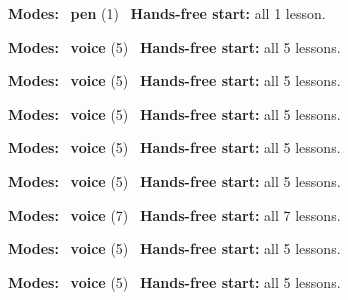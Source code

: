\expandafter\def\csname hlchaptermodality339\endcsname{%
  {\small\noindent
    \textbf{Modes:} \hlpensign{}~\textbf{pen} (1)\quad
    \hlvoicesign{}~\textbf{Hands-free start:} all 1 lesson.%
    \par}\medskip
}

\expandafter\def\csname hlchaptermodality340\endcsname{%
  {\small\noindent
    \textbf{Modes:} \hlvoicesign{}~\textbf{voice} (5)\quad
    \hlvoicesign{}~\textbf{Hands-free start:} all 5 lessons.%
    \par}\medskip
}

\expandafter\def\csname hlchaptermodality341\endcsname{%
  {\small\noindent
    \textbf{Modes:} \hlvoicesign{}~\textbf{voice} (5)\quad
    \hlvoicesign{}~\textbf{Hands-free start:} all 5 lessons.%
    \par}\medskip
}

\expandafter\def\csname hlchaptermodality342\endcsname{%
  {\small\noindent
    \textbf{Modes:} \hlvoicesign{}~\textbf{voice} (5)\quad
    \hlvoicesign{}~\textbf{Hands-free start:} all 5 lessons.%
    \par}\medskip
}

\expandafter\def\csname hlchaptermodality343\endcsname{%
  {\small\noindent
    \textbf{Modes:} \hlvoicesign{}~\textbf{voice} (5)\quad
    \hlvoicesign{}~\textbf{Hands-free start:} all 5 lessons.%
    \par}\medskip
}

\expandafter\def\csname hlchaptermodality344\endcsname{%
  {\small\noindent
    \textbf{Modes:} \hlvoicesign{}~\textbf{voice} (5)\quad
    \hlvoicesign{}~\textbf{Hands-free start:} all 5 lessons.%
    \par}\medskip
}

\expandafter\def\csname hlchaptermodality345\endcsname{%
  {\small\noindent
    \textbf{Modes:} \hlvoicesign{}~\textbf{voice} (7)\quad
    \hlvoicesign{}~\textbf{Hands-free start:} all 7 lessons.%
    \par}\medskip
}

\expandafter\def\csname hlchaptermodality346\endcsname{%
  {\small\noindent
    \textbf{Modes:} \hlvoicesign{}~\textbf{voice} (5)\quad
    \hlvoicesign{}~\textbf{Hands-free start:} all 5 lessons.%
    \par}\medskip
}

\expandafter\def\csname hlchaptermodality347\endcsname{%
  {\small\noindent
    \textbf{Modes:} \hlvoicesign{}~\textbf{voice} (5)\quad
    \hlvoicesign{}~\textbf{Hands-free start:} all 5 lessons.%
    \par}\medskip
}

